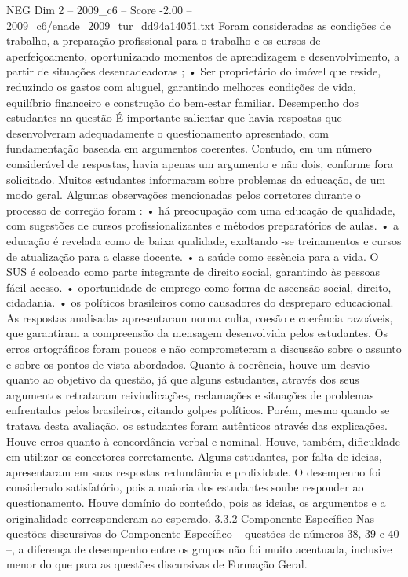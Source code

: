 \begin{textsample}{NEG Dim 2 – 2009\_c6 – Score -2.00 – 2009\_c6/enade\_2009\_tur\_dd94a14051.txt}
Foram consideradas as condições de trabalho, a preparação profissional para o trabalho e os cursos de aperfeiçoamento, oportunizando momentos de aprendizagem e desenvolvimento, a partir de situações desencadeadoras ; • Ser proprietário do imóvel que reside, reduzindo os gastos com aluguel, garantindo melhores condições de vida, equilíbrio financeiro e construção do bem-estar familiar.
Desempenho dos estudantes na questão É importante salientar que havia respostas que desenvolveram adequadamente o questionamento apresentado, com fundamentação baseada em argumentos coerentes.
Contudo, em um número considerável de respostas, havia apenas um argumento e não dois, conforme fora solicitado.
Muitos estudantes informaram sobre problemas da educação, de um modo geral.
Algumas observações mencionadas pelos corretores durante o processo de correção foram : • há preocupação com uma educação de qualidade, com sugestões de cursos profissionalizantes e métodos preparatórios de aulas. • a educação é revelada como de baixa qualidade, exaltando -se treinamentos e cursos de atualização para a classe docente. • a saúde como essência para a vida.
O SUS é colocado como parte integrante de direito social, garantindo às pessoas fácil acesso. • oportunidade de emprego como forma de ascensão social, direito, cidadania. • os políticos brasileiros como causadores do despreparo educacional.
As respostas analisadas apresentaram norma culta, coesão e coerência razoáveis, que garantiram a compreensão da mensagem desenvolvida pelos estudantes.
Os erros ortográficos foram poucos e não comprometeram a discussão sobre o assunto e sobre os pontos de vista abordados.
Quanto à coerência, houve um desvio quanto ao objetivo da questão, já que alguns estudantes, através dos seus argumentos retrataram reivindicações, reclamações e situações de problemas enfrentados pelos brasileiros, citando golpes políticos.
Porém, mesmo quando se tratava desta avaliação, os estudantes foram autênticos através das explicações.
Houve erros quanto à concordância verbal e nominal.
Houve, também, dificuldade em utilizar os conectores corretamente.
Alguns estudantes, por falta de ideias, apresentaram em suas respostas redundância e prolixidade.
O desempenho foi considerado satisfatório, pois a maioria dos estudantes soube responder ao questionamento.
Houve domínio do conteúdo, pois as ideias, os argumentos e a originalidade corresponderam ao esperado. 3.3.2 Componente Específico Nas questões discursivas do Componente Específico – questões de números 38, 39 e 40 –, a diferença de desempenho entre os grupos não foi muito acentuada, inclusive menor do que para as questões discursivas de Formação Geral.

\end{textsample}
